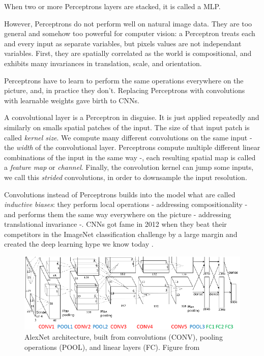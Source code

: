 When two or more Perceptrons layers are stacked, it is called a \ac{MLP}.

However, Perceptrons do not perform well on natural image data. They are too general and somehow too powerful for computer vision: a Perceptron treats each and every input as separate variables, but pixels values are not independant variables. First, they are spatially correlated as the world is compositional, and exhibits many invariances in translation, scale, and orientation.

Perceptrons have to learn to perform the same operations everywhere on the picture, and, in practice they don't. Replacing Perceptrons with convolutions with learnable weights gave birth to \acp{CNN}.

A convolutional layer is a Perceptron in disguise. It is just applied repeatedly and similarly on smalls spatial patches of the input. The size of that input patch is called \emph{kernel size}. We compute many different convolutions on the same input - the \emph{width} of the convolutional layer. Perceptrons compute multiple different linear combinations of the input in the same way -, each resulting spatial map is called a \emph{feature map} or \emph{channel}. Finally, the convolution kernel can jump some inputs, we call this \emph{strided} convolutions, in order to downsample the input resolution.

Convolutions instead of Perceptrons builds into the model what are called \emph{inductive biases}: they perform local operations - addressing compositionality - and performs them the same way everywhere on the picture - addressing translational invariance -. \acp{CNN} got fame in 2012 when they beat their competitors in the ImageNet classification challenge by a large margin and created the deep learning hype we know today \citep{alexnet}.

\begin{figure}
    \centering
    \includegraphics[scale=0.5]{30-activity/AlexNet.png}
    \caption{AlexNet architecture, built from convolutions (CONV), pooling operations (POOL), and linear layers (FC). Figure from \citet{alexnet}}
    \label{fig:alexnet}
\end{figure}

